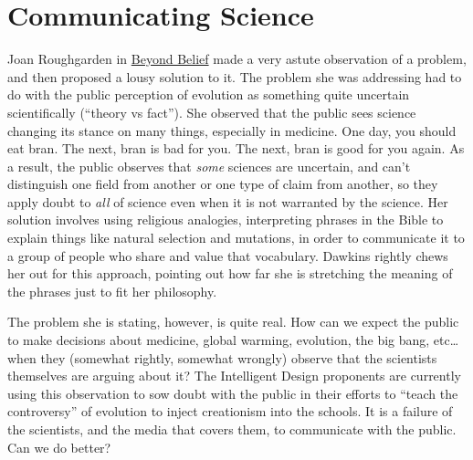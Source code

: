 \section{Communicating Science}

Joan Roughgarden in
\href{http://thesciencenetwork.org/programs/beyond-belief-science-religion-reason-and-survival}{Beyond
Belief} made a very astute observation of a problem, and then proposed a
lousy solution to it. The problem she was addressing had to do with the
public perception of evolution as something quite uncertain
scientifically (``theory vs fact''). She observed that the public sees
science changing its stance on many things, especially in medicine. One
day, you should eat bran. The next, bran is bad for you. The next, bran
is good for you again. As a result, the public observes that \emph{some}
sciences are uncertain, and can't distinguish one field from another or
one type of claim from another, so they apply doubt to \emph{all} of
science even when it is not warranted by the science. Her solution
involves using religious analogies, interpreting phrases in the Bible to
explain things like natural selection and mutations, in order to
communicate it to a group of people who share and value that vocabulary.
Dawkins rightly chews her out for this approach, pointing out how far
she is stretching the meaning of the phrases just to fit her philosophy.

The problem she is stating, however, is quite real. How can we expect
the public to make decisions about medicine, global warming, evolution,
the big bang, etc\ldots{} when they (somewhat rightly, somewhat wrongly)
observe that the scientists themselves are arguing about it? The
Intelligent Design proponents are currently using this observation to sow
doubt with the public in their efforts to ``teach the controversy'' of
evolution to inject creationism into the schools. It is a failure of the
scientists, and the media that covers them, to communicate with the
public. Can we do better?

